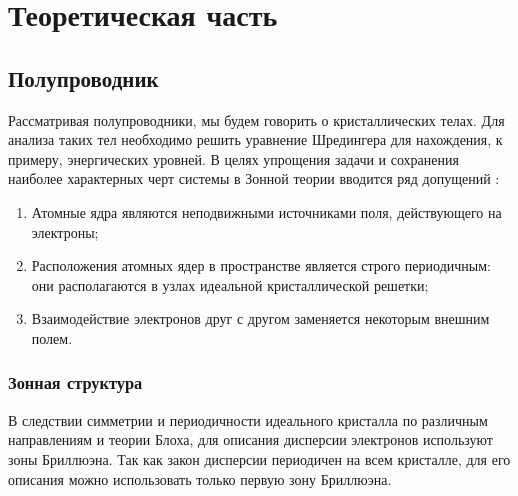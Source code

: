 \chapter{Теоретическая часть}
\section{Полупроводник}
Рассматривая полупроводники, мы будем говорить о кристаллических телах. Для анализа таких тел необходимо решить уравнение Шредингера для нахождения, к примеру, энергических уровней. В целях упрощения задачи и сохранения наиболее характерных черт системы в Зонной теории вводится ряд допущений \cite{Kalashnikov}: 
\begin{enumerate}
	\item Атомные ядра являются неподвижными источниками поля, действующего на электроны;
	\item Расположения атомных ядер в пространстве является строго периодичным: они располагаются в узлах идеальной кристаллической решетки;
	\item Взаимодействие электронов друг с другом заменяется некоторым внешним полем.
\end{enumerate}

\subsection{Зонная структура}
В следствии симметрии и периодичности идеального кристалла по различным направлениям и теории Блоха, для описания дисперсии электронов используют зоны Бриллюэна. Так как закон дисперсии периодичен на всем кристалле, для его описания можно использовать только первую зону Бриллюэна.

